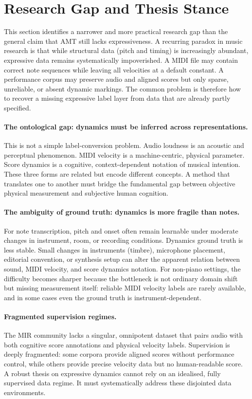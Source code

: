 \section{Research Gap and Thesis Stance}
\label{sec:intro:gap_stance}

This section identifies a narrower and more practical research gap than the general claim that AMT still lacks expressiveness. A recurring paradox in music research is that while structural data (pitch and timing) is increasingly abundant, expressive data remains systematically impoverished. A MIDI file may contain correct note sequences while leaving all velocities at a default constant. A performance corpus may preserve audio and aligned scores but only sparse, unreliable, or absent dynamic markings. The common problem is therefore how to recover a missing expressive label layer from data that are already partly specified.

\paragraph{The ontological gap: dynamics must be inferred across representations.}
This is not a simple label-conversion problem. Audio loudness is an acoustic and perceptual phenomenon. MIDI velocity is a machine-centric, physical parameter. Score dynamics is a cognitive, context-dependent notation of musical intention. These three forms are related but encode different concepts. A method that translates one to another must bridge the fundamental gap between objective physical measurement and subjective human cognition.

\paragraph{The ambiguity of ground truth: dynamics is more fragile than notes.}
For note transcription, pitch and onset often remain learnable under moderate changes in instrument, room, or recording conditions. Dynamics ground truth is less stable. Small changes in instruments (timbre), microphone placement, editorial convention, or synthesis setup can alter the apparent relation between sound, MIDI velocity, and score dynamics notation. For non-piano settings, the difficulty becomes sharper because the bottleneck is not ordinary domain shift but missing measurement itself: reliable MIDI velocity labels are rarely available, and in some cases even the ground truth is instrument-dependent.

\paragraph{Fragmented supervision regimes.}
The MIR community lacks a singular, omnipotent dataset that pairs audio with both cognitive score annotations and physical velocity labels. Supervision is deeply fragmented: some corpora provide aligned scores without performance control, while others provide precise velocity data but no human-readable score. A robust thesis on expressive dynamics cannot rely on an idealised, fully supervised data regime. It must systematically address these disjointed data environments.

